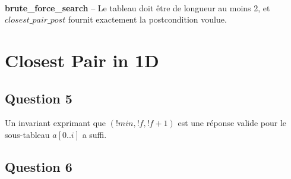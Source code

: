 \documentclass[11pt, openany, titlepage]{article}
\begin{document}
\

\noindent
\textbf{brute\_force\_search} -- Le tableau doit être de longueur au moins 2, et $closest\_pair\_post$ fournit exactement la postcondition voulue.



\section{Closest Pair in 1D}

\subsection{Question 5}

Un invariant exprimant que $(!min,!f,!f+1)$ est une réponse valide pour le sous-tableau ${a[0..i]}$ a suffi.

\subsection{Question 6}
\end{document}
